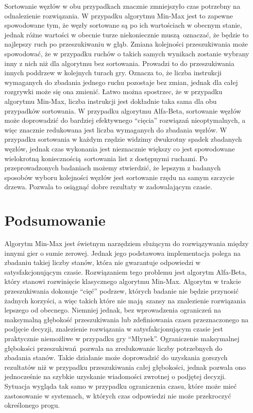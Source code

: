 \documentclass[a4paper,10pt]{article}
\begin{document}
    \justify
    Sortowanie węzłów w obu przypadkach znacznie zmniejszyło czas potrzebny na odnalezienie rozwiązania. W przypadku algorytmu Min-Max jest to zapewne spowodowane tym, że węzły sortowane są po ich wartościach w obecnym stanie, jednak różne wartości w obecnie turze niekoniecznie muszą oznaczać, że będzie to najlepszy ruch po przeszukiwaniu w głąb. Zmiana kolejności przeszukiwania może spowodować, że w przypadku ruchów o takich samych wynikach zostanie wybrany inny z nich niż dla algorytmu bez sortowania. Prowadzi to do przeszukiwania innych poddrzew w kolejnych turach gry. Oznacza to, że liczba instrukcji wymaganych do zbadania jednego ruchu pozostaje bez zmian, jednak dla całej rozgrywki może się ona zmienić. Łatwo można spostrzec, że w przypadku algorytmu Min-Max, liczba instrukcji jest dokładnie taka sama dla obu przypadków sortowania.
    W przypadku algorytmu Alfa-Beta, sortowanie węzłów może doprowadzić do bardziej efektywnego ``cięcia'' rozwiązań nieoptymalnych, a więc znacznie redukowana jest liczba wymaganych do zbadania węzłów. W przypadku sortowania w każdym rzędzie widzimy dwukrotny spadek zbadanych węzłów, jednak czas wykonania jest nieznacznie większy co jest spowodowane wielokrotną koniecznością sortowania list z dostępnymi ruchami.
    Po przeprowadzonych badaniach możemy stwierdzić, że lepszym z badanych sposobów wyboru kolejności węzłów jest sortowanie rzędu na samym szczycie drzewa. Pozwala to osiągnąć dobre rezultaty w zadowalającym czasie.
    
    \section{Podsumowanie}
    Algorytm Min-Max jest świetnym narzędziem służącym do rozwiązywania między innymi gier o sumie zerowej. Jednak jego podstawowa implementacja polega na zbadaniu takiej liczby stanów, która nie gwarantuje odpowiedzi w satysfakcjonującym czasie. Rozwiązaniem tego problemu jest algorytm Alfa-Beta, który stanowi rozwinięcie klasycznego algorytmu Min-Max. Algorytm w trakcie przeszukiwania dokonuje ``cięć'' podrzew, których badanie nie będzie przynosić żadnych korzyści, a więc takich które nie mają szansy na znalezienie rozwiązania lepszego od obecnego. Niemniej jednak, bez wprowadzenia ograniczeń na maksymalną głębokość przeszukiwania lub zdefiniowania czasu przeznaczonego na podjęcie decyzji, znalezienie rozwiązania w satysfakcjonującym czasie jest praktycznie niemożliwe w przypadku gry ``Młynek''. Ograniczenie maksymalnej głębokości przeszukiwań pozwala na zredukowanie liczby potrzebnych do zbadania stanów. Takie działanie może doprowadzić do uzyskania gorszych rezultatów niż w przypadku przeszukiwania całej głębokości, jednak pozwala ono jednocześnie na szybkie uzyskanie wiadomości zwrotnej o podjętej decyzji. Sytuacja wygląda tak samo w przypadku ograniczenia czasu, które może mieć zastosowanie w systemach, w których czas odpowiedzi nie może przekroczyć określonego progu.
    
\end{document}
